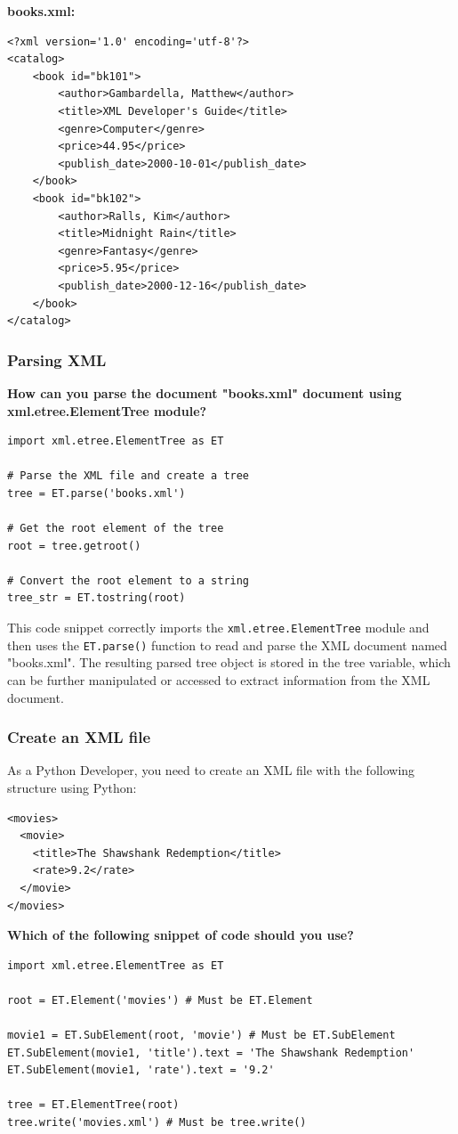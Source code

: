 \textbf{books.xml:}
\begin{verbatim}
<?xml version='1.0' encoding='utf-8'?>
<catalog>
	<book id="bk101">
		<author>Gambardella, Matthew</author>
		<title>XML Developer's Guide</title>
		<genre>Computer</genre>
		<price>44.95</price>
		<publish_date>2000-10-01</publish_date>
	</book>
	<book id="bk102">
		<author>Ralls, Kim</author>
		<title>Midnight Rain</title>
		<genre>Fantasy</genre>
		<price>5.95</price>
		<publish_date>2000-12-16</publish_date>
	</book>
</catalog>
\end{verbatim}

\subsubsection{Parsing XML}
\textbf{How can you parse the document "books.xml" document using xml.etree.ElementTree module?}

\begin{codebox}
\begin{verbatim}
import xml.etree.ElementTree as ET

# Parse the XML file and create a tree
tree = ET.parse('books.xml')

# Get the root element of the tree
root = tree.getroot()  

# Convert the root element to a string
tree_str = ET.tostring(root)
\end{verbatim}
\end{codebox}
This code snippet correctly imports the \texttt{xml.etree.ElementTree} module and then uses the \texttt{ET.parse()} function to read and parse the XML document named "books.xml". The resulting parsed tree object is stored in the tree variable, which can be further manipulated or accessed to extract information from the XML document.

\subsubsection{Create an XML file}
As a Python Developer, you need to create an XML file with the following structure using Python:

\begin{verbatim}
<movies>
  <movie>
    <title>The Shawshank Redemption</title>
    <rate>9.2</rate>
  </movie>
</movies>
\end{verbatim}

\textbf{Which of the following snippet of code should you use?}
\begin{codebox}
\begin{verbatim}
import xml.etree.ElementTree as ET

root = ET.Element('movies') # Must be ET.Element

movie1 = ET.SubElement(root, 'movie') # Must be ET.SubElement
ET.SubElement(movie1, 'title').text = 'The Shawshank Redemption'
ET.SubElement(movie1, 'rate').text = '9.2'

tree = ET.ElementTree(root)
tree.write('movies.xml') # Must be tree.write()
\end{verbatim}
\end{codebox}

